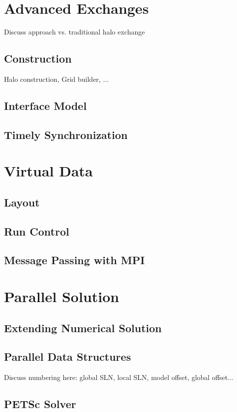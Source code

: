 \chapter{Advanced Exchanges}
 Discuss approach vs. traditional halo exchange

\section{Construction}
Halo construction, Grid builder, ...
\section{Interface Model}
\section{Timely Synchronization}

\chapter{Virtual Data}

\section{Layout}
\section{Run Control}
\section{Message Passing with MPI}

\chapter{Parallel Solution}

\section{Extending Numerical Solution}
\section{Parallel Data Structures}
Discuss numbering here: global SLN, local SLN, model offset, global offset...
\section{PETSc Solver}
